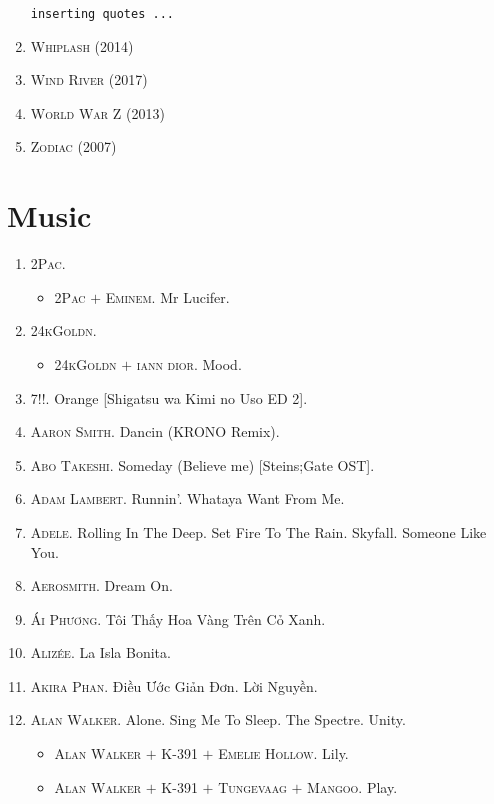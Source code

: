 \documentclass[oneside]{book}
\numberwithin{equation}{section}
\begin{document}
\begin{enumerate}
	\texttt{inserting quotes ...}
	\item \textsc{Whiplash} (2014)
	\item \textsc{Wind River} (2017)
	\item \textsc{World War Z} (2013)
	\item \textsc{Zodiac} (2007)
\end{enumerate}


\chapter{Music}

\begin{enumerate}
	\item \textsc{2Pac.}
	\begin{itemize}
		\item \textsc{2Pac $+$ Eminem.} Mr Lucifer.
	\end{itemize}
	\item \textsc{24kGoldn.}
	\begin{itemize}
		\item \textsc{24kGoldn $+$ iann dior.} Mood.
	\end{itemize}
	\item \textsc{7!!.} Orange [Shigatsu wa Kimi no Uso ED 2].
	\item \textsc{Aaron Smith.} Dancin (KRONO Remix).
	\item \textsc{Abo Takeshi.} Someday (Believe me) [Steins;Gate OST].
	\item \textsc{Adam Lambert.} Runnin'. Whataya Want From Me.
	\item \textsc{Adele.} Rolling In The Deep. Set Fire To The Rain. Skyfall. Someone Like You.
	\item \textsc{Aerosmith.} Dream On.
	\item \textsc{Ái Phương.} Tôi Thấy Hoa Vàng Trên Cỏ Xanh.
	\item \textsc{Alizée.} La Isla Bonita.
	\item \textsc{Akira Phan.} Điều Ước Giản Đơn. Lời Nguyền.
	\item \textsc{Alan Walker.} Alone. Sing Me To Sleep. The Spectre. Unity.
	\begin{itemize}
		\item \textsc{Alan Walker $+$ K-391 $+$ Emelie Hollow.} Lily.
		\item \textsc{Alan Walker $+$ K-391 $+$ Tungevaag $+$ Mangoo.} Play.

\end{itemize}
\end{enumerate}
\end{document}
